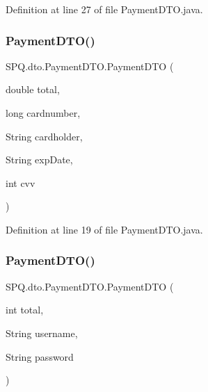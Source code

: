 Definition at line 27 of file Payment\+D\+T\+O.\+java.

\mbox{\label{class_s_p_q_1_1dto_1_1_payment_d_t_o_a4a6f91d0976ce0af97a8f7f15658294c}} 
\subsubsection{\texorpdfstring{Payment\+D\+T\+O()}{PaymentDTO()}\hspace{0.1cm}{\footnotesize\ttfamily [5/6]}}
{\footnotesize\ttfamily S\+P\+Q.\+dto.\+Payment\+D\+T\+O.\+Payment\+D\+TO (\begin{DoxyParamCaption}\item[{double}]{total,  }\item[{long}]{cardnumber,  }\item[{String}]{cardholder,  }\item[{String}]{exp\+Date,  }\item[{int}]{cvv }\end{DoxyParamCaption})}



Definition at line 19 of file Payment\+D\+T\+O.\+java.

\mbox{\label{class_s_p_q_1_1dto_1_1_payment_d_t_o_a409c1e0d8d3b7ed495177258f4eff612}} 
\subsubsection{\texorpdfstring{Payment\+D\+T\+O()}{PaymentDTO()}\hspace{0.1cm}{\footnotesize\ttfamily [6/6]}}
{\footnotesize\ttfamily S\+P\+Q.\+dto.\+Payment\+D\+T\+O.\+Payment\+D\+TO (\begin{DoxyParamCaption}\item[{int}]{total,  }\item[{String}]{username,  }\item[{String}]{password }\end{DoxyParamCaption})}



